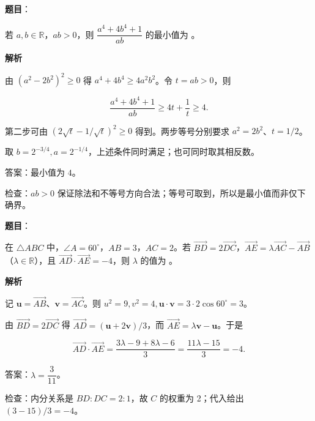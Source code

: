 \begin{answer}

\textbf{题目}：

若 $a,b\in\mathbb R$，$ab>0$，则 $\dfrac{a^4+4b^4+1}{ab}$ 的最小值为 \gkblank{}。

\textbf{解析}

由 $(a^2-2b^2)^2\geqslant0$ 得 $a^4+4b^4\geqslant4a^2b^2$。令 $t=ab>0$，则

\nopagebreak[4]
\[\frac{a^4+4b^4+1}{ab}\geqslant4t+\frac1t\geqslant4.\]

第二步可由 $(2\sqrt t-1/\sqrt t)^2\geqslant0$ 得到。两步等号分别要求 $a^2=2b^2$、$t=1/2$。

取 $b=2^{-3/4},a=2^{-1/4}$，上述条件同时满足；也可同时取其相反数。

答案：最小值为 $\boxed4$。

检查：$ab>0$ 保证除法和不等号方向合法；等号可取到，所以是最小值而非仅下确界。


\end{answer}
\begin{answer}

\textbf{题目}：

在 $\triangle ABC$ 中，$\angle A=60^\circ$，$AB=3$，$AC=2$。若 $\overrightarrow{BD}=2\overrightarrow{DC}$，$\overrightarrow{AE}=\lambda\overrightarrow{AC}-\overrightarrow{AB}$（$\lambda\in\mathbb R$），且 $\overrightarrow{AD}\cdot\overrightarrow{AE}=-4$，则 $\lambda$ 的值为 \gkblank{}。

\textbf{解析}

记 $\boldsymbol u=\overrightarrow{AB}$、$\boldsymbol v=\overrightarrow{AC}$。则 $u^2=9,v^2=4,\boldsymbol u\cdot\boldsymbol v=3\cdot2\cos60^\circ=3$。

由 $\overrightarrow{BD}=2\overrightarrow{DC}$ 得 $\overrightarrow{AD}=(\boldsymbol u+2\boldsymbol v)/3$，而 $\overrightarrow{AE}=\lambda\boldsymbol v-\boldsymbol u$。于是

\nopagebreak[4]
\[\overrightarrow{AD}\cdot\overrightarrow{AE}=\frac{3\lambda-9+8\lambda-6}{3}=\frac{11\lambda-15}{3}=-4.\]

答案：$\boxed{\lambda=\dfrac3{11}}$。

检查：内分关系是 $BD:DC=2:1$，故 $C$ 的权重为 2；代入给出 $(3-15)/3=-4$。


\end{answer}
